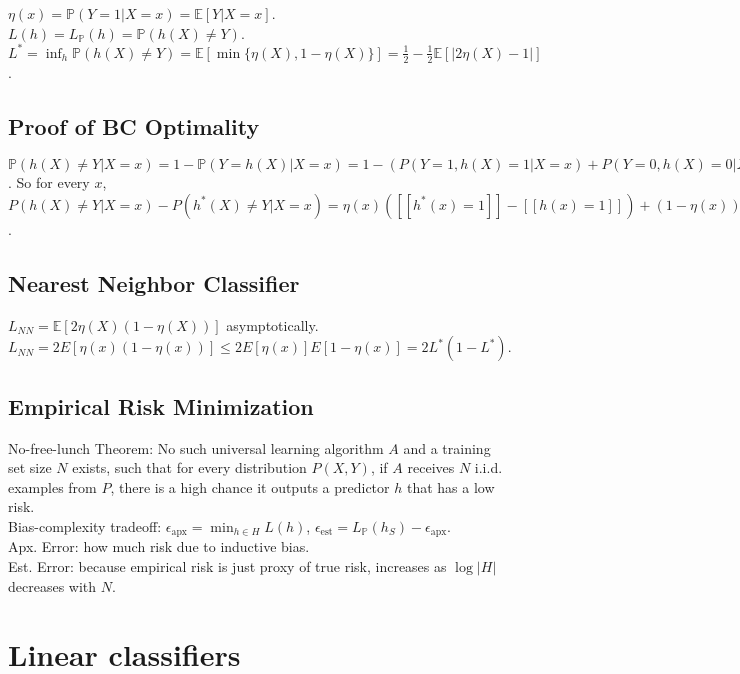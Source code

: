 $\eta(x) = \mathbb{P}(Y=1|X=x) = \mathbb{E}[Y|X=x]$.\\
$L(h) = L_{\mathbb{P}}(h) = \mathbb{P}(h(X)\neq Y)$.\\
$L^* = \inf_h \mathbb{P}(h(X) \neq Y) = \mathbb{E}[\min\{\eta(X), 1-\eta(X)\}] = \frac{1}{2} - \frac{1}{2}\mathbb{E}[|2\eta(X) - 1|]$.

\subsection*{Proof of BC Optimality}

\begin{mdframed}
$\mathbb{P}(h(X) \neq Y | X = x) = 1 - \mathbb{P}(Y = h(X)|X=x) = 1 - (P(Y=1,h(X)=1|X=x) + P(Y=0,h(X)=0|X=x)) = 1 - ([[h(x)=1]]P(Y=1|X=x) + [[h(x)=0]]P(Y=0|X=x)) = 1 - ([[h(x)=1]]\eta(x) + [[h(x)=0]](1-\eta(x)))$. So for every $x$, $P(h(X) \neq Y|X=x) - P(h^*(X) \neq Y | X=x) = \eta(x)([[h^*(x)=1]] - [[h(x)=1]]) + (1-\eta(x))([[h^*(x)=0]]-[[h(x)=0]]) = (2\eta(x) - 1)([[h^*(x)=1]]-[[h(x)=1]]) \geq 0$.
\end{mdframed}

\subsection*{Nearest Neighbor Classifier}

$L_{NN} = \mathbb{E}[2\eta(X)(1-\eta(X))]$ asymptotically.\\
$L_{NN} = 2E[\eta(x)(1-\eta(x))] \leq 2E[\eta(x)]E[1-\eta(x)] = 2L^*(1-L^*)$.

\subsection*{Empirical Risk Minimization}

No-free-lunch Theorem: No such universal learning algorithm $A$ and a training set size $N$ exists, such that for every distribution $P(X,Y)$, if $A$ receives $N$ i.i.d. examples from $P$, there is a high chance it outputs a predictor $h$ that has a low risk.\\
Bias-complexity tradeoff: $\epsilon_{\text{apx}} = \min_{h \in H}L(h)$, $\epsilon_{\text{est}} = L_\mathbb{P}(h_S) - \epsilon_{\text{apx}}$.\\
Apx. Error: how much risk due to inductive bias.\\
Est. Error: because empirical risk is just proxy of true risk, increases as $\log |H|$ decreases with $N$.

\section{Linear classifiers}

